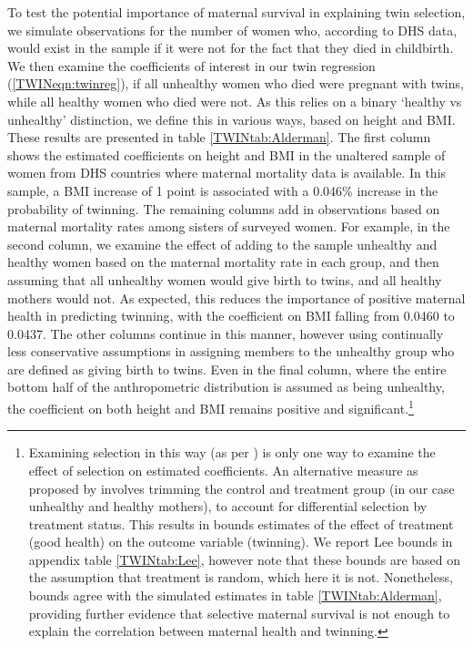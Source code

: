 \documentclass[subeqn]{article}
\begin{document}
\begin{spacing}{1.4}
To test the potential importance of maternal survival in explaining twin 
selection, we simulate observations for the number of women who, according to 
DHS data, would exist in the sample if it were not for the fact that they died 
in childbirth.  We then examine the coefficients of interest in our twin 
regression (\ref{TWINeqn:twinreg}), if all unhealthy women who died were 
pregnant with twins, while all healthy women who died were not.  As this relies 
on a binary `healthy vs unhealthy' distinction, we define this in various ways, 
based on height and BMI.  These results are presented in table 
\ref{TWINtab:Alderman}.  The first column shows the estimated coefficients on 
height and BMI in the unaltered sample of women from DHS countries where 
maternal mortality data is available.  In this sample, a BMI increase of 1 
point is associated with a 0.046\% increase in the probability of twinning. The 
remaining columns add in observations based on maternal mortality rates among 
sisters of surveyed women.  For example, in the second column, we examine the 
effect of adding to the sample unhealthy and healthy women based on the maternal 
mortality rate in each group, and then assuming that all unhealthy women would 
give birth to twins, and all healthy mothers would not. As expected, this 
reduces the importance of positive maternal health in predicting twinning, with 
the coefficient on BMI falling from 0.0460 to 0.0437. The other columns continue 
in this manner, however using continually less conservative assumptions in 
assigning members to the unhealthy group who are defined as giving birth to 
twins. Even in the final column, where the entire bottom half of the 
anthropometric distribution is assumed as being unhealthy, the coefficient on 
both height and BMI remains positive and significant.\footnote{Examining 
selection in this way (as per \citet{Aldermanetal2011}) is only one way to 
examine the effect of selection on estimated coefficients.  An alternative 
measure as proposed by \citet{Lee2009} involves trimming the control and 
treatment group (in our case unhealthy and healthy mothers), to account for 
differential selection by treatment status.  This results in bounds estimates 
of the effect of treatment (good health) on the outcome variable (twinning). We 
report Lee bounds in appendix table \ref{TWINtab:Lee}, however note that these 
bounds are based on the assumption that treatment is random, which here it is 
not.  Nonetheless, \citet{Lee2009} bounds agree with the simulated estimates in 
table \ref{TWINtab:Alderman}, providing further evidence that selective maternal 
survival is not enough to explain the correlation between maternal health and 
twinning.}


\end{spacing}
\end{document}
